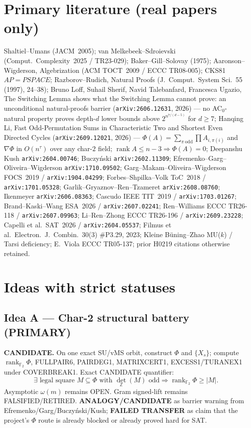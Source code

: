 \documentclass[11pt]{article}
\begin{document}
\section*{Primary literature (real papers only)}
Shaltiel--Umans (JACM~2005); van Melkebeek--Sdroievski (Comput.\ Complexity~2025 /
TR23-029); Baker--Gill--Solovay (1975); Aaronson--Wigderson, Algebrization
(ACM TOCT~2009 / ECCC TR08-005); CKS81 $AP=PSPACE$; Razborov--Rudich, Natural
Proofs (J.\ Comput.\ System Sci.\ 55 (1997), 24--38);
Bruno Loff, Suhail Sherif, Navid Talebanfard, Francesca Ugazio, The Switching
Lemma shows what the Switching Lemma cannot prove: an unconditional
natural-proofs barrier (\texttt{arXiv:2606.12631}, 2026) --- no AC$_0$-natural
property proves depth-$d$ lower bounds above $2^{n^{7/(d-5)}}$ for $d\ge 7$;
Hanqing Li, Fast Odd-Permutation Sums in Characteristic Two and Shortest Even
Directed Cycles (\texttt{arXiv:2609.12021}, 2026) --- $\Phi(A)=\sum_{\pi\ \mathrm{odd}}\prod A_{i,\pi(i)}$
and $\nabla\Phi$ in $O(n^{\tau})$ over any char-$2$ field; $\operatorname{rank}A\le n-3\Rightarrow\Phi(A)=0$;
Deepanshu Kush \texttt{arXiv:2604.00746}; Buczy\'nski \texttt{arXiv:2602.11309};
Efremenko--Garg--Oliveira--Wigderson \texttt{arXiv:1710.09502};
Garg--Makam--Oliveira--Wigderson FOCS~2019 / \texttt{arXiv:1904.04299};
Forbes--Shpilka--Volk ToC~2018 / \texttt{arXiv:1701.05328};
Garlik--Gryaznov--Ren--Tzameret \texttt{arXiv:2608.08760};
Ikenmeyer \texttt{arXiv:2606.08363};
Cascudo IEEE TIT~2019 / \texttt{arXiv:1703.01267};
Brand--Kaski--Wang ESA~2026 / \texttt{arXiv:2607.02241};
Ren--Williams ECCC TR26-118 / \texttt{arXiv:2607.09963};
Li--Ren--Zhong ECCC TR26-196 / \texttt{arXiv:2609.23228};
Capelli et al.\ SAT~2026 / \texttt{arXiv:2604.05537};
Filmus et al.\ Electron.\ J.\ Combin.\ 30(3) \#P3.29, 2023;
Kleine B\"uning--Zhao MU($k$) / Tarsi deficiency;
E.\ Viola ECCC TR05-137; prior H0219 citations otherwise retained.

\section*{Ideas with strict statuses}
\subsection*{Idea A --- Char-2 structural battery (PRIMARY)}
\textbf{CANDIDATE.} On one exact SU/vMS orbit, construct $\Phi$ and $\{X_s\}$;
compute $\operatorname{rank}_{\mathbb F_2}\Phi$, FULLPAIR6, PAIRDEG1, MATRIXCERT1,
EXCESS1/TURANEX1 under COVERBREAK1. Exact CANDIDATE quantifier:
\[
\exists\text{ legal square }M\subseteq\Phi\text{ with }\det_{\mathbb Z}(M)\text{ odd}
\Rightarrow\operatorname{rank}_{\mathbb F_2}\Phi\ge|M|.
\]
Asymptotic $\omega(m)$ remains OPEN. Gram signed-lift remains FALSIFIED/RETIRED.
\textbf{ANALOGY/CANDIDATE} as barrier warning from Efremenko/Garg/Buczy\'nski/Kush;
\textbf{FAILED TRANSFER} as claim that the project's $\Phi$ route is already
blocked or already proved hard for SAT.
\end{document}
